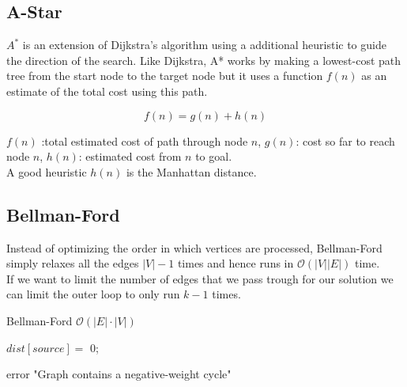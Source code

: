 \documentclass[9pt,landscape,a4paper, table]{extarticle}
\begin{document}
\begin{multicols*}{3}
\subsection{A-Star}

$A^*$ is an extension of Dijkstra's algorithm using a additional heuristic to guide the direction of the search. Like Dijkstra, A* works by making a lowest-cost path tree from the start node to the target node but it uses a function $f(n)$ as an estimate of the total cost using this path. 

$$f(n) = g(n) + h(n)$$

$f(n)$ :total estimated cost of path through node $n$,
$g(n)$: cost so far to reach node $n$,
$h(n)$: estimated cost from $n$ to goal.\\

A good heuristic $h(n)$ is the Manhattan distance. 

\subsection{Bellman-Ford}

Instead of optimizing the order in which vertices are processed, Bellman-Ford simply relaxes all the edges $|V| - 1$ times and hence runs in $\mathcal{O}(|V| |E|)$ time.\\
If we want to limit the number of edges that we pass trough for our solution we can limit the outer loop to only run $k - 1$ times.

{\scriptsize
\begin{algorithm}[H]
    \caption{Bellman-Ford $\mathcal{O}(|E| \cdot |V|) $}
    
    \SetAlgoLined
    
    $dist[source] =$ 0;
    

    
    {
        {
            error "Graph contains a negative-weight cycle"
        }
    }
\end{algorithm}}





\end{multicols*}
\end{document}

